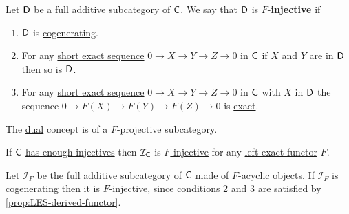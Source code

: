 \documentclass[../../main]{subfiles}
\begin{document}
\begin{definition}\label{def:F-injective-subcategory}
  Let \(\mathsf{D}\) be a \hyperref[def:full-additive-subcategory]{full additive subcategory} of \(\mathsf{C}\).
  We say that \(\mathsf{D}\) is \(F\)-\textbf{injective} if
  \begin{enumerate}
    \item \(\mathsf{D}\) is \hyperref[def:cogenerating-category]{cogenerating}.
    \item For any \hyperref[def:exact-sequence]{short exact sequence} \(0 \to X \to Y \to Z \to 0\) in \(\mathsf{C}\) if \(X\) and \(Y\) are in \(\mathsf{D}\) then so is \(\mathsf{D}\).
    \item For any \hyperref[def:exact-sequence]{short exact sequence} \(0 \to X \to Y \to Z \to 0\) in \(\mathsf{C}\) with \(X\) in \(\mathsf{D}\) the sequence \(0 \to F(X) \to F(Y) \to F(Z) \to 0\) is \hyperref[def:exact-sequence]{exact}.
  \end{enumerate}

  The \hyperref[def:dual]{dual} concept is of a \(F\)-projective subcategory.
\end{definition}

\begin{example}
  If \(\mathsf{C}\) \hyperref[def:enough-injectives-projectives]{has enough injectives} then \(\mathcal{I}_{\mathsf{C}}\) is \hyperref[def:F-injective-subcategory]{\(F\)-injective} for any \hyperref[def:exact-functor]{left-exact functor} \(F\).
\end{example}

\begin{example}
  Let \(\mathcal{I}_{F}\) be the \hyperref[def:full-additive-subcategory]{full additive subcategory} of \(\mathsf{C}\) made of \hyperref[def:F-acyclic-object]{\(F\)-acyclic objects}.
  If \(\mathcal{I}_{F}\) is \hyperref[def:cogenerating-category]{cogenerating} then it is \hyperref[def:F-injective-subcategory]{\(F\)-injective}, since conditions 2 and 3 are satisfied by \autoref{prop:LES-derived-functor}.
\end{example}
\end{document}
